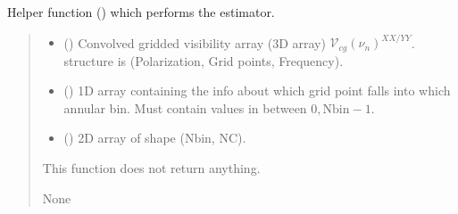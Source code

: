 \documentclass[a4paper,11pt,oneside,english,openany]{sphinxmanual}
\begin{document}
\begin{fulllineitems}
\label{\detokenize{correlate:correlate.correlate_fast}}
\pysigstartsignatures
{}
\pysigstopsignatures
\sphinxAtStartPar
Helper function () which performs the  estimator.
\begin{quote}\begin{description}
\begin{itemize}
\item {} 
\sphinxAtStartPar
{} () \textendash{} Convolved gridded visibility array (3D array) \(\mathcal{V}_{cg}(\nu_n)^{XX/YY}\).  structure is (Polarization, Grid points, Frequency).

\item {} 
\sphinxAtStartPar
{} () \textendash{} 1D array containing the info about which grid point falls into which annular bin. Must contain values in between \(0,\textrm{Nbin}-1\).

\item {} 
\sphinxAtStartPar
{} () \textendash{} 2D array of shape (Nbin, NC).

\end{itemize}

\sphinxAtStartPar
This function does not return anything.

\sphinxAtStartPar
None

\end{description}\end{quote}

\end{fulllineitems}

\end{document}
